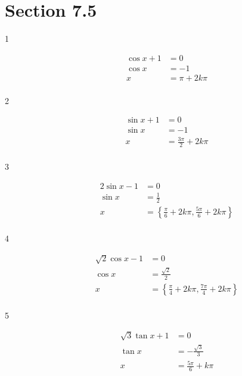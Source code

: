 \documentclass{exam}
\begin{document}
    \section{Section 7.5}
    \begin{description}

      \item[1] 
        \begin{align*}
          \cos x + 1 & = 0 \\
          \cos x     & = -1 \\
          x          & = \boxed{ \pi + 2 k \pi } \\
        \end{align*}

      \item[2] 
        \begin{align*}
          \sin x + 1 & = 0 \\
          \sin x     & = -1 \\
          x          & = \boxed{ \frac{3 \pi}{2} + 2 k \pi } \\
        \end{align*}

      \item[3] 
        \begin{align*}
          2 \sin x - 1 & = 0 \\
          \sin x       & = \frac{1}{2} \\
          x            & = \boxed{ \left\{ \frac{\pi}{6} + 2 k \pi, \frac{5 \pi}{6} + 2 k \pi \right\} } \\
        \end{align*}

      \item[4] 
        \begin{align*}
          \sqrt{2} \cos x - 1 & = 0 \\
          \cos x              & = \frac{\sqrt{2}}{2} \\
          x                   & = \boxed{ \left\{ \frac{\pi}{4} + 2 k \pi, \frac{7 \pi}{4} + 2 k \pi \right\} } \\
        \end{align*}

      \item[5] 
        \begin{align*}
          \sqrt{3} \tan x + 1 & = 0 \\
          \tan x              & = - \frac{\sqrt{3}}{3} \\
          x                   & = \boxed{ \frac{5 \pi}{6} + k \pi } \\
        \end{align*}


\end{description}
\end{document}
